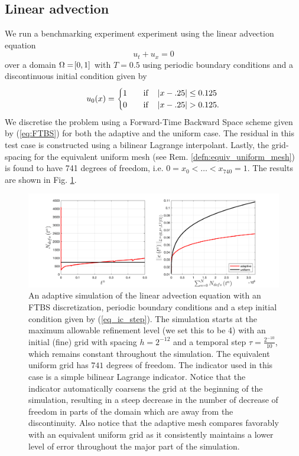 \documentclass[final]{amsart}
\numberwithin{equation}{section}
\begin{document}
\subsection{Linear advection}
We run a benchmarking experiment experiment using the linear advection equation
\begin{equation}
u_t+u_x=0
\end{equation}
over a domain $\Omega = \!\left[{0,1}\right]$ with $T=0.5$ using periodic boundary conditions and a discontinuous initial condition given by
\begin{equation}\label{eq_ic_step}
u_0\qp{x}=\begin{cases}
1\quad&\text{if}\quad \norm{x-.25}\leq 0 .125\\
0\quad&\text{if} \quad \norm{x-.25}>  0.125.
\end{cases}
\end{equation}
We discretise the problem using a Forward-Time Backward Space scheme given by (\ref{eq:FTBS}) for both the adaptive and the uniform case. The residual in this test case is constructed using a bilinear Lagrange interpolant.  Lastly, the grid-spacing for the equivalent uniform mesh (see Rem. \ref{defn:equiv_uniform_mesh}) is found to have 741 degrees of freedom, i.e. $0=x_0<\dots<x_{740}=1$.  The results are shown in Fig. \ref{fig:FTBS_linadvect_adapt}.

\begin{figure}[H]
\centering
\includegraphics[width=\textwidth]{../figures/fig_FTBSplots_1x5_step_IC_P1_comparison_adaptONOFF}	
	\caption{\label{fig:FTBS_linadvect_adapt} An adaptive simulation of the linear advection equation with an FTBS discretization, periodic boundary conditions and a step initial condition given by (\ref{eq_ic_step}).  The simulation starts at the maximum allowable refinement level (we set this to be 4) with an initial (fine) grid with spacing $h=2^{-12}$ and a temporal step $\tau =\frac{2^{-10}}{10}$, which remains constant throughout the simulation. The equivalent uniform grid has $741$ degrees of freedom.  The indicator used in this case is a simple bilinear Lagrange indicator.  Notice that the indicator automatically coarsens the grid at the beginning of the simulation, resulting in a steep decrease in the number of decrease of freedom in parts of the domain which are away from the discontinuity. Also notice that the adaptive mesh compares favorably with an equivalent uniform grid as it consistently maintains a lower level of error throughout the major part of the simulation.}
\end{figure}
\end{document}
